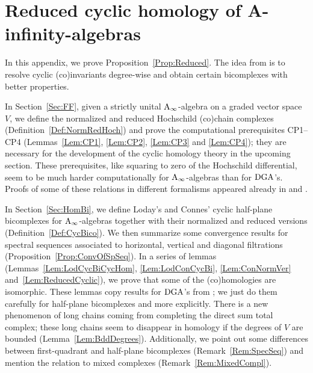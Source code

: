 \documentclass[\MainFolder/Text.tex]{subfiles}
\begin{document}
\chapter{Reduced cyclic homology of A-infinity-algebras}

In this appendix, we prove Proposition~\ref{Prop:Reduced}. The idea from \cite{LodayCyclic} is to resolve cyclic (co)invariants degree-wise and obtain certain bicomplexes with better properties.

In Section~\ref{Sec:FF}, given a strictly unital $\mathrm{A}_\infty$-algebra on a graded vector space $V$, we define the normalized and reduced Hochschild (co)chain complexes (Definition~\ref{Def:NormRedHoch}) and prove the computational prerequisites CP1--CP4 (Lemmas~\ref{Lem:CP1}, \ref{Lem:CP2}, \ref{Lem:CP3} and \ref{Lem:CP4}); they are necessary for the development of the cyclic homology theory in the upcoming section. These prerequisites, like squaring to zero of the Hochschild differential, seem to be much harder computationally for $\mathrm{A}_\infty$-algebras than for $\mathrm{DGA}$'s. Proofs of some of these relations in different formalisms appeared already in \cite{Mescher2016} and \cite{Lazarev2003}.

In Section~\ref{Sec:HomBi}, we define Loday's and Connes' cyclic half-plane bicomplexes for $\mathrm{A}_\infty$-algebras together with their normalized and reduced versions (Definition~\ref{Def:CycBico}). We then summarize some convergence results for spectral sequences associated to horizontal, vertical and diagonal filtrations (Proposition~\ref{Prop:ConvOfSpSeq}). In a series of lemmas (Lemmas~\ref{Lem:LodCycBiCycHom}, \ref{Lem:LodConCycBi}, \ref{Lem:ConNormVer} and~\ref{Lem:ReducedCyclic}), we prove that some of the (co)homologies are isomorphic. These lemmas copy results for $\mathrm{DGA}$'s from \cite{LodayCyclic}; we just do them carefully for half-plane bicomplexes and more explicitly. There is a new phenomenon of long chains coming from completing the direct sum total complex; these long chains seem to disappear in homology if the degrees of $V$ are bounded (Lemma~\ref{Lem:BddDegrees}). Additionally, we point out some differences between first-quadrant and half-plane bicomplexes (Remark~\ref{Rem:SpecSeq}) and mention the relation to mixed complexes (Remark~\ref{Rem:MixedCompl}).
\end{document}
